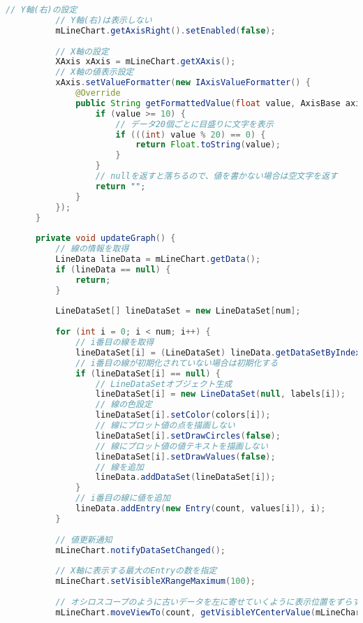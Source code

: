 \documentclass[dvipdfmx,autodetect-engine,titlepage]{jsarticle}
\begin{document}
\begin{lstlisting}[language=java]
          // Y軸(右)の設定
          // Y軸(右)は表示しない
          mLineChart.getAxisRight().setEnabled(false);
  
          // X軸の設定
          XAxis xAxis = mLineChart.getXAxis();
          // X軸の値表示設定
          xAxis.setValueFormatter(new IAxisValueFormatter() {
              @Override
              public String getFormattedValue(float value, AxisBase axis) {
                  if (value >= 10) {
                      // データ20個ごとに目盛りに文字を表示
                      if (((int) value % 20) == 0) {
                          return Float.toString(value);
                      }
                  }
                  // nullを返すと落ちるので、値を書かない場合は空文字を返す
                  return "";
              }
          });
      }
  
      private void updateGraph() {
          // 線の情報を取得
          LineData lineData = mLineChart.getData();
          if (lineData == null) {
              return;
          }
  
          LineDataSet[] lineDataSet = new LineDataSet[num];
  
          for (int i = 0; i < num; i++) {
              // i番目の線を取得
              lineDataSet[i] = (LineDataSet) lineData.getDataSetByIndex(i);
              // i番目の線が初期化されていない場合は初期化する
              if (lineDataSet[i] == null) {
                  // LineDataSetオブジェクト生成
                  lineDataSet[i] = new LineDataSet(null, labels[i]);
                  // 線の色設定
                  lineDataSet[i].setColor(colors[i]);
                  // 線にプロット値の点を描画しない
                  lineDataSet[i].setDrawCircles(false);
                  // 線にプロット値の値テキストを描画しない
                  lineDataSet[i].setDrawValues(false);
                  // 線を追加
                  lineData.addDataSet(lineDataSet[i]);
              }
              // i番目の線に値を追加
              lineData.addEntry(new Entry(count, values[i]), i);
          }
  
          // 値更新通知
          mLineChart.notifyDataSetChanged();
  
          // X軸に表示する最大のEntryの数を指定
          mLineChart.setVisibleXRangeMaximum(100);
  
          // オシロスコープのように古いデータを左に寄せていくように表示位置をずらす
          mLineChart.moveViewTo(count, getVisibleYCenterValue(mLineChart), YAxis.AxisDependency.LEFT);
  

\end{lstlisting}
\end{document}
